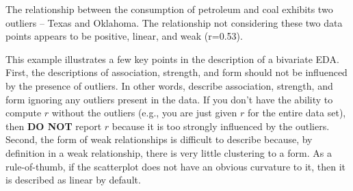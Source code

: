 \documentclass[10pt,openany]{book}\usepackage[]{graphicx}\usepackage[]{color}
\begin{document}
The relationship between the consumption of petroleum and coal exhibits two outliers -- Texas and Oklahoma.  The relationship not considering these two data points appears to be positive, linear, and weak (r=0.53).

This example illustrates a few key points in the description of a bivariate EDA.  First, the descriptions of association, strength, and form should not be influenced by the presence of outliers.  In other words, describe association, strength, and form ignoring any outliers present in the data.  If you don't have the ability to compute $r$ without the outliers (e.g., you are just given $r$ for the entire data set), then \textbf{DO NOT} report $r$ because it is too strongly influenced by the outliers.  Second, the form of weak relationships is difficult to describe because, by definition in a weak relationship, there is very little clustering to a form.  As a rule-of-thumb, if the scatterplot does not have an obvious curvature to it, then it is described as linear by default.

\end{document}
